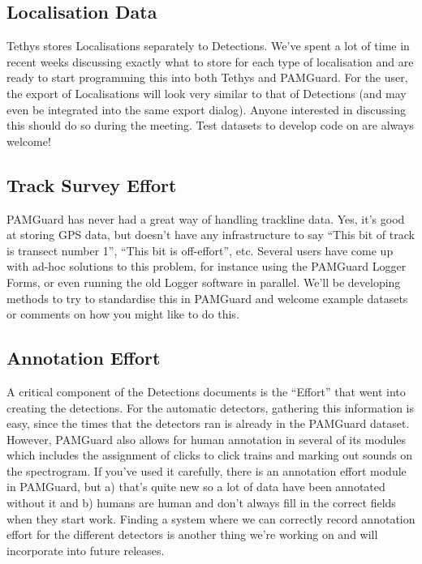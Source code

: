 \documentclass[
]{article}
\begin{document}
\subsection{Localisation Data}\label{localisation-data}

Tethys stores Localisations separately to Detections. We've spent a lot
of time in recent weeks discussing exactly what to store for each type
of localisation and are ready to start programming this into both Tethys
and PAMGuard. For the user, the export of Localisations will look very
similar to that of Detections (and may even be integrated into the same
export dialog). Anyone interested in discussing this should do so during
the meeting. Test datasets to develop code on are always welcome!

\subsection{Track Survey Effort}\label{track-survey-effort}

PAMGuard has never had a great way of handling trackline data. Yes, it's
good at storing GPS data, but doesn't have any infrastructure to say
``This bit of track is transect number 1'', ``This bit is off-effort'',
etc. Several users have come up with ad-hoc solutions to this problem,
for instance using the PAMGuard Logger Forms, or even running the old
Logger software in parallel. We'll be developing methods to try to
standardise this in PAMGuard and welcome example datasets or comments on
how you might like to do this.

\subsection{Annotation Effort}\label{annotation-effort}

A critical component of the Detections documents is the ``Effort'' that
went into creating the detections. For the automatic detectors,
gathering this information is easy, since the times that the detectors
ran is already in the PAMGuard dataset. However, PAMGuard also allows
for human annotation in several of its modules which includes the
assignment of clicks to click trains and marking out sounds on the
spectrogram. If you've used it carefully, there is an annotation effort
module in PAMGuard, but a) that's quite new so a lot of data have been
annotated without it and b) humans are human and don't always fill in
the correct fields when they start work. Finding a system where we can
correctly record annotation effort for the different detectors is
another thing we're working on and will incorporate into future
releases.
\end{document}
